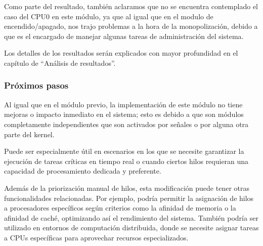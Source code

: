 Como parte del resultado, también aclaramos que no se encuentra contemplado el caso del CPU0 en este módulo, ya que al igual que en el modulo de encendido/apagado, nos trajo problemas a la hora de la monopolización, debido a que es el encargado de manejar algunas tareas de administración del sistema.

Los detalles de los resultados serán explicados con mayor profundidad en el capítulo de
“Análisis de resultados”.

\subsubsection{Próximos pasos}

Al igual que en el módulo previo, la implementación de este módulo no tiene mejoras o impacto inmediato en el sistema; esto es debido a que son módulos completamente independientes que son activados por señales o por alguna otra parte del kernel.

Puede ser especialmente útil en escenarios en los que se necesite garantizar la ejecución de tareas críticas en tiempo real o cuando ciertos hilos requieran una capacidad de procesamiento dedicada y preferente.

Además de la priorización manual de hilos, esta modificación puede tener otras funcionalidades relacionadas. Por ejemplo, podría permitir la asignación de hilos a procesadores específicos según criterios como la afinidad de memoria o la afinidad de caché, optimizando así el rendimiento del sistema. También podría ser utilizado en entornos de computación distribuida, donde se necesite asignar tareas a CPUs específicas para aprovechar recursos especializados.

